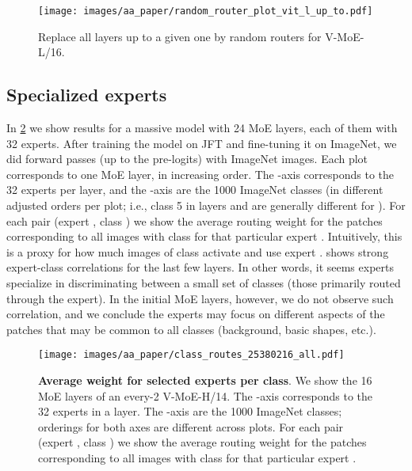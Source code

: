 \documentclass{article}
\newcommand{\abbv}{{V-MoE}}
\begin{document}
\begin{figure}[h]
\centering
\texttt{[image: images/aa\_paper/random\_router\_plot\_vit\_l\_up\_to.pdf]}
\caption{Replace all layers up to a given one by random routers for \abbv{}-L/16.}
\label{im:random_router_up_to}
\end{figure}

\subsection{Specialized experts}
\label{app_analysis_specialized_experts}


In \cref{im:routes_class_experts_all} we show results for a massive model with 24 MoE layers, each of them with 32 experts.
After training the model on JFT and fine-tuning it on ImageNet, we did forward passes (up to the pre-logits) with ImageNet images.
Each plot corresponds to one MoE layer, in increasing order.
The -axis corresponds to the 32 experts per layer, and the -axis are the 1000 ImageNet classes (in different adjusted orders per plot; i.e., class 5 in layers  and  are generally different for ).
For each pair (expert , class ) we show the average routing weight for the patches corresponding to all images with class  for that particular expert .
Intuitively, this is a proxy for how much images of class  activate and use expert .
 shows strong expert-class correlations for the last few layers.
In other words, it seems experts specialize in discriminating between a small set of classes (those primarily routed through the expert).
In the initial MoE layers, however, we do not observe such correlation, and we conclude the experts may focus on different aspects of the patches that may be common to all classes (background, basic shapes, etc.).

\begin{figure}[h]
\centering
\texttt{[image: images/aa\_paper/class\_routes\_25380216\_all.pdf]}
\caption{
\textbf{Average weight for selected experts per class}.
We show the 16 MoE layers of an every-2 \abbv{}-H/14. The -axis corresponds to the 32 experts in a layer. The -axis are the 1000 ImageNet classes; orderings for both axes are different across plots.
For each pair (expert , class ) we show the average routing weight for the patches corresponding to all images with class  for that particular expert .}
\label{im:routes_class_experts_all}
\end{figure}
\end{document}
